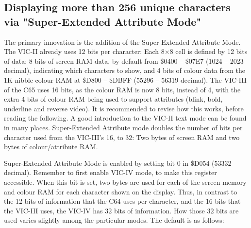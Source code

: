 \subsection{Displaying more than 256 unique characters via
"Super-Extended Attribute Mode"}

The primary innovation is the addition of the Super-Extended Attribute Mode. The VIC-II already uses 12 bits per character: Each 8$\times$8
cell is defined by 12 bits of data: 8 bits of screen RAM data, by
default from \$0400 -- \$07E7 (1024 -- 2023 decimal), indicating which
characters to show, and 4 bits of colour data from the 1K nibble colour
RAM at \$D800 -- \$DBFF (55296 -- 56319 decimal). The VIC-III of the
C65 uses 16 bits, as the colour RAM is now 8 bits, instead of 4, with
the extra 4 bits of colour RAM being used to support attributes (blink,
bold, underline and reverse video).  It is recommended to revise how
this works, before reading the following. A good introduction to the
VIC-II text mode can be found in many places.
Super-Extended Attribute mode doubles the number of bits per character used from the VIC-III’s 16, to 32: Two bytes of screen RAM and two bytes of
colour/attribute RAM.

Super-Extended Attribute Mode is enabled by setting bit 0 in \$D054
(53332 decimal). Remember to first enable VIC-IV mode, to make this
register accessible. When this bit is set, two bytes are used for each
of the screen memory and colour RAM for each character shown on the
display. Thus, in contrast to the 12 bits of information that the C64
uses per character, and the 16 bits that the VIC-III uses, the VIC-IV
has 32 bits of information.  How those 32 bits are used varies slightly
among the particular modes.  The default is as follows:

